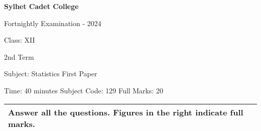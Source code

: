 \documentclass[10pt]{article}
\begin{document}
\begin{center}
  \bfseries\large
  Sylhet Cadet College

\normalsize
Fortnightly Examination - 2024

  Class: XII
  
  2nd Term

  Subject: Statistics First Paper

  Time: 40 minutes \qquad \qquad  \qquad \qquad Subject Code: 129  \qquad  \qquad \qquad  \qquad Full Marks: 20

\end{center}

\noindent
\begin{tabular}{p{\dimexpr\linewidth-2\tabcolsep}}
  \textbf{Answer all the questions. Figures in the right indicate full marks.}\\
  \hline
\end{tabular}
\end{document}
